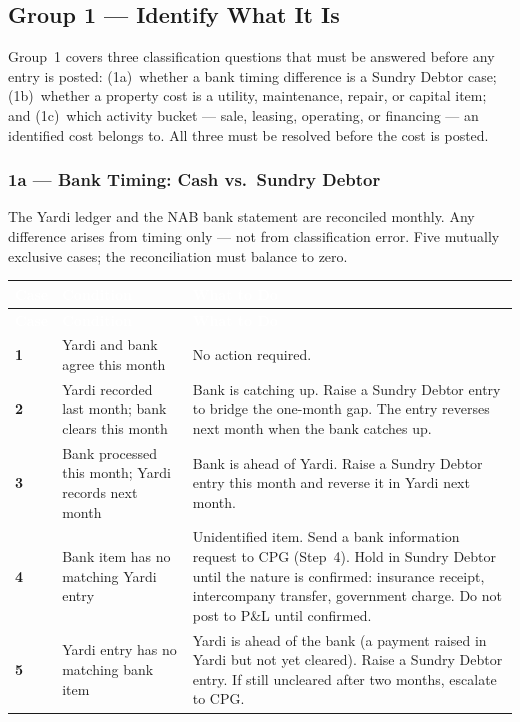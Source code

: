 \documentclass[10pt,a4paper]{article}
\begin{document}
\subsection{Group 1 --- Identify What It Is}
\label{sec:fivecase}

Group~1 covers three classification questions that must be answered before any entry is posted: (1a)~whether a bank timing difference is a Sundry Debtor case; (1b)~whether a property cost is a utility, maintenance, repair, or capital item; and (1c)~which activity bucket --- sale, leasing, operating, or financing --- an identified cost belongs to. All three must be resolved before the cost is posted.

\subsubsection{1a --- Bank Timing: Cash vs.\ Sundry Debtor}
\label{sec:grp1a}

The Yardi ledger and the NAB bank statement are reconciled monthly. Any difference arises from timing only --- not from classification error. Five mutually exclusive cases; the reconciliation must balance to zero.

{\small\sffamily
\begin{longtable}{@{} C{0.7cm} L{3.6cm} p{\dimexpr\textwidth-4.3cm-6\tabcolsep\relax} @{}}
\textcolor{white}{\bfseries Case} & \textcolor{white}{\bfseries Condition} & \textcolor{white}{\bfseries What to Do} \\
\midrule
\endfirsthead
{}\textcolor{white}{\bfseries Case} & \textcolor{white}{\bfseries Condition} & \textcolor{white}{\bfseries What to Do} \\
\midrule
\endhead
\textbf{1} & Yardi and bank agree this month & No action required. \\
\midrule
{}
\textbf{2} & Yardi recorded last month; bank clears this month & Bank is catching up. Raise a Sundry Debtor entry to bridge the one-month gap. The entry reverses next month when the bank catches up. \\
\midrule
\textbf{3} & Bank processed this month; Yardi records next month & Bank is ahead of Yardi. Raise a Sundry Debtor entry this month and reverse it in Yardi next month. \\
\midrule
{}
\textbf{4} & Bank item has no matching Yardi entry & Unidentified item. Send a bank information request to CPG (Step~4). Hold in Sundry Debtor until the nature is confirmed: insurance receipt, intercompany transfer, government charge. Do not post to P\&L until confirmed. \\
\midrule
\textbf{5} & Yardi entry has no matching bank item & Yardi is ahead of the bank (a payment raised in Yardi but not yet cleared). Raise a Sundry Debtor entry. If still uncleared after two months, escalate to CPG. \\
\bottomrule
\end{longtable}}
\end{document}
